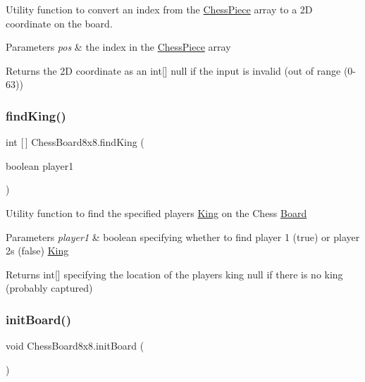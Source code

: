Utility function to convert an index from the \mbox{\hyperlink{class_chess_piece}{Chess\+Piece}} array to a 2D coordinate on the board. 
\begin{DoxyParams}{Parameters}
{\em pos} & the index in the \mbox{\hyperlink{class_chess_piece}{Chess\+Piece}} array \\
\hline
\end{DoxyParams}
\begin{DoxyReturn}{Returns}
the 2D coordinate as an int\mbox{[}\mbox{]} null if the input is invalid (out of range (0-\/63)) 
\end{DoxyReturn}
\mbox{\label{class_chess_board8x8_a5197215b78b6870d81ae12a76d28177e}} 
\subsubsection{\texorpdfstring{find\+King()}{findKing()}}
{\footnotesize\ttfamily int \mbox{[}$\,$\mbox{]} Chess\+Board8x8.\+find\+King (\begin{DoxyParamCaption}\item[{boolean}]{player1 }\end{DoxyParamCaption})\hspace{0.3cm}{\ttfamily [protected]}}

Utility function to find the specified player\textquotesingle{}s \mbox{\hyperlink{class_king}{King}} on the Chess \mbox{\hyperlink{class_board}{Board}} 
\begin{DoxyParams}{Parameters}
{\em player1} & boolean specifying whether to find player 1 (true) or player 2\textquotesingle{}s (false) \mbox{\hyperlink{class_king}{King}} \\
\hline
\end{DoxyParams}
\begin{DoxyReturn}{Returns}
int\mbox{[}\mbox{]} specifying the location of the player\textquotesingle{}s king null if there is no king (probably captured) 
\end{DoxyReturn}
\mbox{\label{class_chess_board8x8_aaa6bdac1813e13604323507365a34e27}} 
\subsubsection{\texorpdfstring{init\+Board()}{initBoard()}}
{\footnotesize\ttfamily void Chess\+Board8x8.\+init\+Board (\begin{DoxyParamCaption}{ }\end{DoxyParamCaption})}


